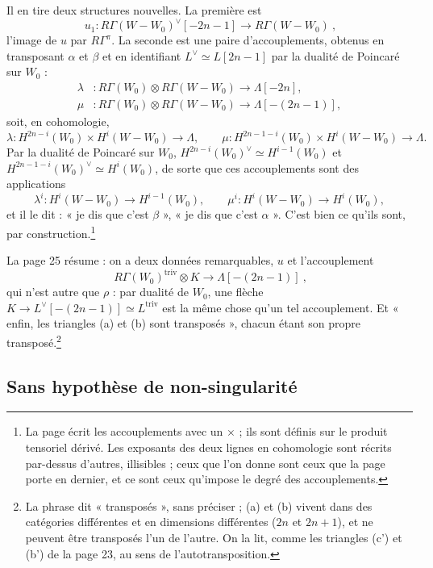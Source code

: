 \documentclass[11pt,a4paper]{article}
\begin{document}
Il en tire deux structures nouvelles. La première est
\[
  \boxed{\ u_1 : R\Gamma(W - W_0)^{\vee}[-2n-1] \longrightarrow R\Gamma(W - W_0)\ },
\]
l'image de $u$ par $R\Gamma^{\pi}$. La seconde est une paire d'accouplements,
obtenus en transposant $\alpha$ et $\beta$ et en identifiant
$L^{\vee} \simeq L[2n-1]$ par la dualité de Poincaré sur $W_0$ :
\[
  \boxed{\begin{aligned}
    \lambda &: R\Gamma(W_0) \otimes R\Gamma(W - W_0) \longrightarrow \Lambda[-2n], \\
    \mu &: R\Gamma(W_0) \otimes R\Gamma(W - W_0) \longrightarrow \Lambda[-(2n-1)],
  \end{aligned}}
\]
soit, en cohomologie,
\[
  \lambda : H^{2n-i}(W_0) \times H^{i}(W - W_0) \to \Lambda, \qquad
  \mu : H^{2n-1-i}(W_0) \times H^{i}(W - W_0) \to \Lambda .
\]
Par la dualité de Poincaré sur $W_0$, $H^{2n-i}(W_0)^{\vee} \simeq
H^{i-1}(W_0)$ et $H^{2n-1-i}(W_0)^{\vee} \simeq H^{i}(W_0)$, de sorte que ces
accouplements sont des applications
\[
  \lambda^{i} : H^{i}(W - W_0) \to H^{i-1}(W_0), \qquad
  \mu^{i} : H^{i}(W - W_0) \to H^{i}(W_0),
\]
et il le dit : « je dis que c'est $\beta$ », « je dis que c'est $\alpha$ ».
C'est bien ce qu'ils sont, par construction.\footnote{La page écrit les
accouplements avec un $\times$ ; ils sont définis sur le produit tensoriel
dérivé. Les exposants des deux lignes en cohomologie sont récrits par-dessus
d'autres, illisibles ; ceux que l'on donne sont ceux que la page porte en
dernier, et ce sont ceux qu'impose le degré des accouplements.}

La page 25 résume : on a deux données remarquables, $u$ et l'accouplement
\[
  \boxed{\ R\Gamma(W_0)^{\mathrm{triv}} \otimes K \longrightarrow \Lambda[-(2n-1)]\ },
\]
qui n'est autre que $\rho$ : par dualité de $W_0$, une flèche
$K \to L^{\vee}[-(2n-1)] \simeq L^{\mathrm{triv}}$ est la même chose qu'un tel
accouplement. Et « enfin, les triangles (a) et (b) sont transposés », chacun
étant son propre transposé.\footnote{La phrase dit « transposés », sans
préciser ; (a) et (b) vivent dans des catégories différentes et en dimensions
différentes ($2n$ et $2n+1$), et ne peuvent être transposés l'un de l'autre. On
la lit, comme les triangles (c') et (b') de la page 23, au sens de
l'autotransposition.}

\subsection*{Sans hypothèse de non-singularité}
\end{document}
